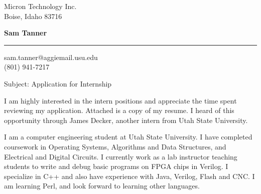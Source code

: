 \documentclass{letter} %
\begin{document}
\signature{Sam Tanner}           %
\longindentation=0pt                       %
\let\raggedleft\raggedright                %
 
\begin{large}
\begin{letter}{Micron Technology Inc.\\
Boise, Idaho 83716}


\begin{flushleft}
{\LARGE\bf Sam Tanner}
\end{flushleft}
\medskip\hrule height 1pt
\begin{flushright}
\hfill sam.tanner@aggiemail.usu.edu \\
\hfill (801) 941-7217 
\end{flushright} 
\vfill %

 
\opening{Subject: Application for Internship\\} 
 
\noindent I am highly interested in the intern positions and appreciate the time spent reviewing my application.  Attached is a copy of my resume. I heard of this opportunity through James Decker, another intern from Utah State University.
 

 
\noindent 

I am a computer engineering student at Utah State University. I have completed coursework in
Operating Systems, Algorithms and Data Structures, and Electrical and Digital Circuits. I currently work as a lab instructor teaching students to write and debug basic programs on FPGA chips in Verilog. I specialize in C++ and also have experience with Java, Verilog, Flash and CNC. I am learning Perl, and look forward to learning other languages.


 

\end{letter}
\end{large}
\end{document}
